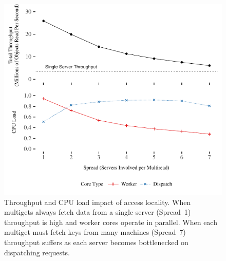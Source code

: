 \begin{figure}
\centering
\includegraphics[width=1.0\columnwidth]{graphs/ramcloud-colocation.pdf}
\caption{Throughput and CPU load impact of access locality. When multigets
always fetch data from a single server (Spread~1) throughput is high and
worker cores operate in parallel. When each multiget must fetch keys from
many machines (Spread~7) throughput suffers as each server becomes
bottlenecked on dispatching requests.}
\label{fig:colocation}
\end{figure}
